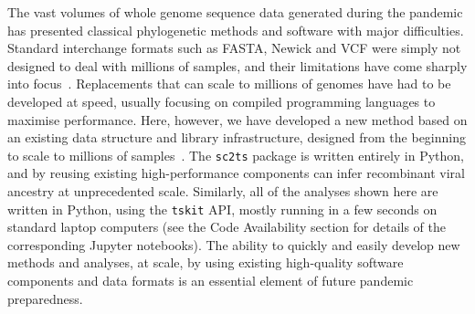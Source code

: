 \documentclass{article}
\begin{document}
The vast volumes of whole genome sequence data generated during the pandemic
has presented classical phylogenetic methods and software with major difficulties.
Standard interchange formats such as FASTA, Newick and VCF were simply not designed
to deal with millions of samples, and their limitations have come sharply
into focus~\citep{Turakhia2021-ur,de2023maximum}.
Replacements that can scale to millions of genomes have had to be developed
at speed, usually focusing on compiled programming languages to maximise
performance. Here, however, we have developed a new method based on
an existing data structure and library infrastructure, designed
from the beginning to scale to millions of
samples~\citep{Kelleher2016-wk,Kelleher2019-ba}.
The \texttt{sc2ts} package is written entirely in Python,
and by reusing existing high-performance components can infer
recombinant viral ancestry at unprecedented scale.
Similarly, all of the analyses shown here are written in Python,
using the \texttt{tskit} API, mostly running in a few seconds
on standard laptop computers (see the Code Availability
section for details of the corresponding Jupyter notebooks).
The ability to quickly and easily develop new methods and
analyses, at scale, by using existing high-quality software
components and data formats is an essential element of future
pandemic preparedness.

\end{document}
